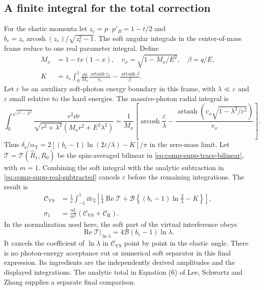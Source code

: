 \subsection{A finite integral for the total correction}
For the elastic momenta let $z_e=p\cdot p'_B=1-t/2$ and
$b_e=z_e\operatorname{arcosh}(z_e)/\sqrt{z_e^2-1}$.
The soft angular integrals in the center-of-mass frame reduce to
one real parameter integral. Define
\begin{align}
 M_x&=1-tx(1-x),\quad v_x=\sqrt{1-M_x/E^2},\quad \beta=q/E,\\
 K&=z_e\int_0^1\frac{\dd x}{M_x}
              \frac{\operatorname{artanh}v_x}{v_x}
                   -\frac{\operatorname{artanh}\beta}{\beta}.
\end{align}
Let $\varepsilon$ be an auxiliary soft-photon energy boundary in
this frame, with $\lambda\ll\varepsilon$ and $\varepsilon$ small
relative to the hard energies. The massive-photon radial integral is
\begin{equation}
 \int_0^{\sqrt{\varepsilon^2-\lambda^2}}
 \frac{r^2\dd r}{\sqrt{r^2+\lambda^2}(M_xr^2+E^2\lambda^2)}
 =\frac1{M_x}\left[
 \operatorname{arcosh}\frac\varepsilon\lambda
 -\frac{\operatorname{artanh}(v_x\sqrt{1-\lambda^2/\varepsilon^2})}{v_x}
 \right].
\end{equation}
Thus $\delta_{\mathrm s}/\alpha_{\mathrm T}
=2[(b_e-1)\ln(2\varepsilon/\lambda)-K]/\pi$ in the
zero-mass limit. Let
$\mathcal T=\mathcal T(\widehat R_1,R_0)$ be the spin-averaged
bilinear in \eqref{eq:comp-supp-trace-bilinear}, with $m=1$. Combining the soft integral
with the analytic subtraction in
\eqref{eq:comp-supp-real-subtracted} cancels $\varepsilon$ before
the remaining integrations. The result is
\begin{align}
 \mathcal C_{\mathrm{VS}}
 &=\frac1s\int_{-1}^1\dd c_2\left[
 \frac14\operatorname{Re}\mathcal T
 +\mathcal B\left\{(b_e-1)\ln\frac2\lambda-K\right\}\right],\\
 \sigma_1&=\boxed{\frac{\alpha_{\mathrm T}^3}{m^2}
             (\mathcal C_{\mathrm{VS}}+\mathcal C_{\mathrm R}).}
 \label{eq:comp-supp-independent-total}
\end{align}
In the normalization used here, the soft part of the virtual
interference obeys
\begin{equation}
 \left.\operatorname{Re}\mathcal T\right|_{\ln\lambda}
      =4\mathcal B(b_e-1)\ln\lambda.
\end{equation}
It cancels the coefficient of $\ln\lambda$ in
$\mathcal C_{\mathrm{VS}}$ point by point in the elastic angle.
There is no photon-energy acceptance cut or numerical soft separator
in this final expression. Its ingredients are the independently
derived amplitudes and the displayed integrations. The analytic
total in Equation (6) of Lee, Schwartz and Zhang
\cite{qed-processes-lsz} supplies a separate final comparison.

